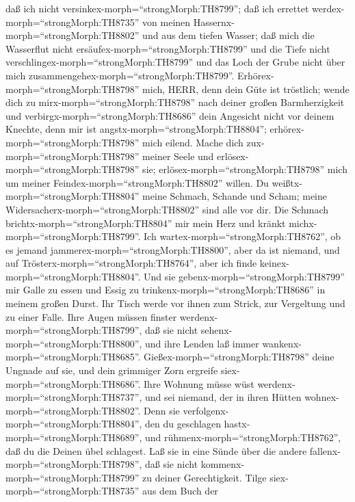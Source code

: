 daß ich nicht versinkex-morph=``strongMorph:TH8799''; daß ich errettet
werdex-morph=``strongMorph:TH8735'' von meinen
Hassernx-morph=``strongMorph:TH8802'' und aus dem tiefen Wasser;
 daß mich die Wasserflut nicht
ersäufex-morph=``strongMorph:TH8799'' und die Tiefe nicht
verschlingex-morph=``strongMorph:TH8799'' und das Loch der Grube nicht
über mich zusammengehex-morph=``strongMorph:TH8799''. 
Erhörex-morph=``strongMorph:TH8798'' mich, HERR, denn dein Güte ist
tröstlich; wende dich zu mirx-morph=``strongMorph:TH8798'' nach deiner
großen Barmherzigkeit  und
verbirgx-morph=``strongMorph:TH8686'' dein Angesicht nicht vor deinem
Knechte, denn mir ist angstx-morph=``strongMorph:TH8804'';
erhörex-morph=``strongMorph:TH8798'' mich eilend.  Mache
dich zux-morph=``strongMorph:TH8798'' meiner Seele und
erlösex-morph=``strongMorph:TH8798'' sie;
erlösex-morph=``strongMorph:TH8798'' mich um meiner
Feindex-morph=``strongMorph:TH8802'' willen.  Du
weißtx-morph=``strongMorph:TH8804'' meine Schmach, Schande und Scham;
meine Widersacherx-morph=``strongMorph:TH8802'' sind alle vor dir.
 Die Schmach brichtx-morph=``strongMorph:TH8804'' mir mein
Herz und kränkt michx-morph=``strongMorph:TH8799''. Ich
wartex-morph=``strongMorph:TH8762'', ob es jemand
jammerex-morph=``strongMorph:TH8800'', aber da ist niemand, und auf
Trösterx-morph=``strongMorph:TH8764'', aber ich finde
keinex-morph=``strongMorph:TH8804''.  Und sie
gebenx-morph=``strongMorph:TH8799'' mir Galle zu essen und Essig zu
trinkenx-morph=``strongMorph:TH8686'' in meinem großen Durst.
 Ihr Tisch werde vor ihnen zum Strick, zur Vergeltung und
zu einer Falle.  Ihre Augen müssen finster
werdenx-morph=``strongMorph:TH8799'', daß sie nicht
sehenx-morph=``strongMorph:TH8800'', und ihre Lenden laß immer
wankenx-morph=``strongMorph:TH8685''. 
Gießex-morph=``strongMorph:TH8798'' deine Ungnade auf sie, und dein
grimmiger Zorn ergreife siex-morph=``strongMorph:TH8686''. 
Ihre Wohnung müsse wüst werdenx-morph=``strongMorph:TH8737'', und sei
niemand, der in ihren Hütten wohnex-morph=``strongMorph:TH8802''.
 Denn sie verfolgenx-morph=``strongMorph:TH8804'', den du
geschlagen hastx-morph=``strongMorph:TH8689'', und
rühmenx-morph=``strongMorph:TH8762'', daß du die Deinen übel schlagest.
 Laß sie in eine Sünde über die andere
fallenx-morph=``strongMorph:TH8798'', daß sie nicht
kommenx-morph=``strongMorph:TH8799'' zu deiner Gerechtigkeit.
 Tilge siex-morph=``strongMorph:TH8735'' aus dem Buch der
